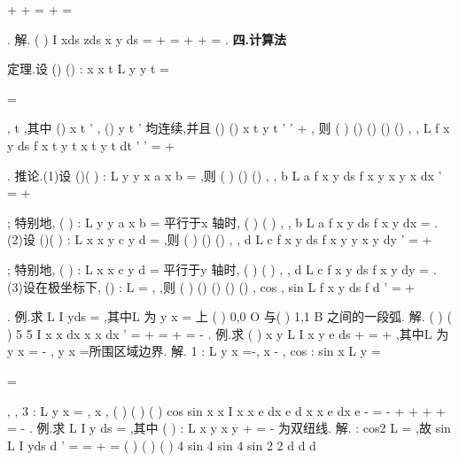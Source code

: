 +
+
=
\Gamma +
=

. 
解.
(
)
I
xds
zds
x
y ds
\Gamma 
\Gamma 
\Gamma 
=
+
=
+
+
=
\int 
\int 
\int 
\nabla 
\nabla 
\nabla 
. 
\vspace{4pt}
{\bfseries \textcolor{lyred}{四.计算法}}

\textcolor{lyred}{定理}.设
()
()
: x
x t
L
y
y t
=

=

,
t
\alpha 
\beta 
\le \le 
,其中
()
x t
'
,
()
y t
'
均连续,并且
()
()
x
t
y
t
'
'
+
\neq 
, 
则
(
)
()
()
()
()
,
,
L
f x y ds
f
x t
y t
x
t
y
t dt
\beta 
\alpha 
'
'
=
+




\int 
\int 
. 
\textcolor{lyred}{推论}.(1)设
()(
)
:
L y
y x
a
x
b
=
\le 
\le 
,则
(
)
()
()
,
,
b
L
a
f x y ds
f
x y x
y
x dx
'
=
+




\int 
\int 
; 
特别地,
(
)
:
L y
y
a
x
b
=
\le 
\le 
平行于x 轴时,
(
)
(
)
,
,
b
L
a
f x y ds
f x y
dx
=
\int 
\int 
. 
(2)设
()(
)
:
L x
x y
c
y
d
=
\le 
\le 
,则
(
)
()
()
,
,
d
L
c
f x y ds
f
x y
y
x
y dy
'
=
+




\int 
\int 
; 
特别地,
(
)
:
L x
x
c
y
d
=
\le 
\le 
平行于y 轴时,
(
)
(
)
,
,
d
L
c
f x y ds
f x
y dy
=
\int 
\int 
. 
(3)设在极坐标下,
()
:
L \rho 
\rho \theta 
=
,\alpha 
\theta 
\beta 
\le 
\le 
,则 
(
)
()
()
()
()
,
cos ,
sin
L
f x y ds
f
d
\beta 
\alpha 
\rho \theta 
\theta \rho \theta 
\theta 
\rho 
\theta 
\rho 
\theta 
\theta 
'
=
+




\int 
\int 
. 
\textcolor{lyred}{例}.求
L
I
yds
=\int 
,其中L 为
y
x
=
上
(
)
0,0
O
与(
)
1,1
B
之间的一段弧. 
解.
(
)
(
)
5 5
I
x
x
dx
x
x dx
'
=
\cdots 
+
=
\cdots 
+
=
-
\int 
\int 
. 
\textcolor{lyred}{例}.求
(
)
x
y
L
I
x
y e
ds
+
=
+
\int \nabla 
,其中L 为
y
x
=
-
, y
x
=\pm 所围区域边界. 
解.
1 :
L
y
x
=-,
x
-
\le 
\le 
,
cos
:
sin
x
L
y
\theta 
\theta 
=


=

,
\pi 
\pi 
\theta 
\le 
\le 
,
3 :
L
y
x
=
,
x
\le 
\le 
, 
(
)
(
)
(
)
cos
sin
x
x
I
x
x e
dx
e d
x
x e
dx
e
\pi 
\pi 
\theta 
\theta 
\theta 
-
=
-
+
+
+
+
=
-
\int 
\int 
\int 
. 
\textcolor{lyred}{例}.求
L
I
y ds
=\int \nabla 
,其中
(
)
:
L
x
y
x
y
+
=
-
为双纽线. 
解.
:
cos2
L \rho 
\theta 
=
,故
sin
L
I
yds
d
\pi 
\rho 
\theta 
\rho 
\rho 
\theta 
'
=
=
\cdots 
+
=
\int 
\int 
(
)
(
)
(
)
4 sin
4 sin
4 sin
2 2
d
d
d
\pi 
\pi 
\pi 
\theta 
\rho 
\rho \rho 
\theta 
\theta 
\rho 
\rho 
\theta 
\theta \theta 

